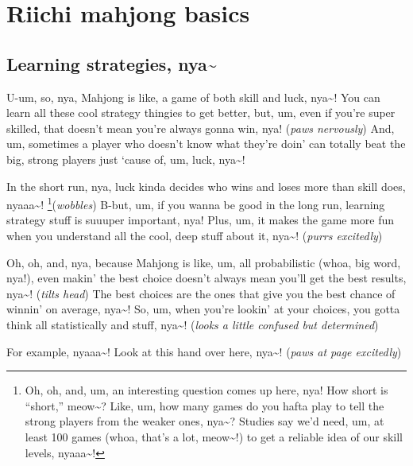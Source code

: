 \chapter{Riichi mahjong basics}\label{ch:basic}
\thispagestyle{empty}

\section{Learning strategies, nya\textasciitilde}

U-um, so, nya, Mahjong is like, a game of both skill and luck, nya\textasciitilde! You
can learn all these cool strategy thingies to get better, but, um, even if
you’re super skilled, that doesn’t mean you’re always gonna win, nya! (\textit{paws
nervously}) And, um, sometimes a player who doesn’t know what they’re doin’
can totally beat the big, strong players just ‘cause of, um, luck, nya\textasciitilde!

In the short run, nya, luck kinda decides who wins and loses more than skill
does, nyaaa\textasciitilde! \footnote{
Oh, oh, and, um, an interesting question comes up here, nya! How short is
“short,” meow\textasciitilde? Like, um, how many games do you hafta play to tell the strong
players from the weaker ones, nya\textasciitilde? Studies say we’d need, um, at least 100
games (whoa, that’s a lot, meow\textasciitilde!) to get a reliable idea of our skill levels,
nyaaa\textasciitilde!
}(\textit{wobbles})
B-but, um, if you wanna be good in the long run, learning strategy stuff is
suuuper important, nya! Plus, um, it makes the game more fun when you
understand all the cool, deep stuff about it, nya\textasciitilde! (\textit{purrs excitedly})

\bigskip

Oh, oh, and, nya, because Mahjong is like, um, all probabilistic (whoa, big
word, nya!), even makin’ the best choice doesn’t always mean you’ll get the
best results, nya\textasciitilde! (\textit{tilts head}) The best choices are the ones that
give you the best chance of winnin’ on average, nya\textasciitilde! So, um, when you’re
lookin’ at your choices, you gotta think all statistically and stuff, nya\textasciitilde! (\textit{looks
a little confused but determined})

\bigskip

For example, nyaaa\textasciitilde! Look at this hand over here, nya\textasciitilde! (\textit{paws at page
excitedly})

